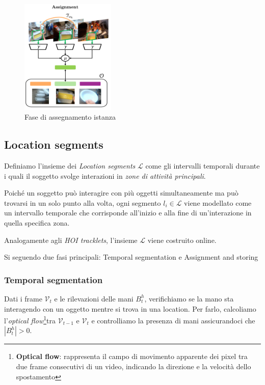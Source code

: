 \begin{figure}[ht]
    \centering
    \includegraphics[width=0.4\textwidth]{Images/assign_store.png}
    \caption{Fase di assegnamento istanza}
    \label{fig:store}
\end{figure}

\subsection*{Location segments}
Definiamo l'insieme dei \emph{Location segments} $\mathcal{L}$ come gli intervalli temporali durante i quali il soggetto svolge interazioni in \emph{zone di attività principali}.

Poiché un soggetto può interagire con più oggetti simultaneamente ma può trovarsi in un solo punto alla volta, ogni segmento $l_i \in \mathcal{L}$ viene modellato come un intervallo temporale che corrisponde all'inizio e alla fine di un'interazione in quella specifica zona.  

Analogamente agli \emph{HOI tracklets}, l'insieme $\mathcal{L}$ viene costruito online.

Si seguendo due fasi principali: Temporal segmentation e Assignment and storing

\subsubsection*{Temporal segmentation}
Dati i frame $\mathcal{V}_t$ e le rilevazioni delle mani $B_t^h$, verifichiamo se la mano sta interagendo con un oggetto mentre si trova in una location. Per farlo, calcoliamo l'\emph{optical flow}\footnote{\textbf{Optical flow}: rappresenta il campo di movimento apparente dei pixel tra due frame consecutivi di un video, indicando la direzione e la velocità dello spostamento}tra $\mathcal{V}_{t-1}$ e $\mathcal{V}_t$ e controlliamo la presenza di mani assicurandoci che $|B_t^h|>0$.

